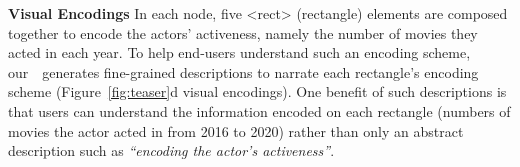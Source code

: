 \noindent \textbf{Visual Encodings}
In each node, five <rect> (rectangle) elements are composed together to encode the actors' activeness, namely the number of movies they acted in each year.
To help end-users understand such an encoding scheme, our~\ApproachName~generates fine-grained descriptions to narrate each rectangle's encoding scheme (Figure~\ref{fig:teaser}d visual encodings).
One benefit of such descriptions is that users can understand the information encoded on each rectangle (numbers of movies the actor acted in from 2016 to 2020) rather than only an abstract description such as \textit{``encoding the actor's activeness''}.
